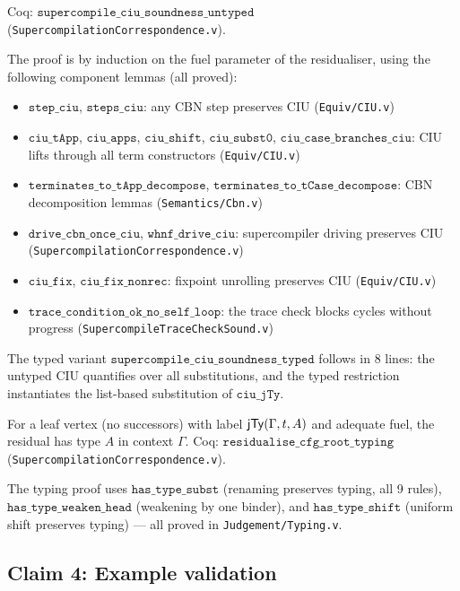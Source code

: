 \noindent Coq: $\texttt{supercompile\_ciu\_soundness\_untyped}$ (\texttt{SupercompilationCorrespondence.v}).

The proof is by induction on the fuel parameter of the residualiser, using the following component lemmas (all proved):
\begin{itemize}[leftmargin=*,nosep]
\item $\texttt{step\_ciu}$, $\texttt{steps\_ciu}$: any CBN step preserves CIU (\texttt{Equiv/CIU.v})
\item $\texttt{ciu\_tApp}$, $\texttt{ciu\_apps}$, $\texttt{ciu\_shift}$, $\texttt{ciu\_subst0}$, $\texttt{ciu\_case\_branches\_ciu}$: CIU lifts through all term constructors (\texttt{Equiv/CIU.v})
\item $\texttt{terminates\_to\_tApp\_decompose}$, $\texttt{terminates\_to\_tCase\_decompose}$: CBN decomposition lemmas (\texttt{Semantics/Cbn.v})
\item $\texttt{drive\_cbn\_once\_ciu}$, $\texttt{whnf\_drive\_ciu}$: supercompiler driving preserves CIU (\texttt{SupercompilationCorrespondence.v})
\item $\texttt{ciu\_fix}$, $\texttt{ciu\_fix\_nonrec}$: fixpoint unrolling preserves CIU (\texttt{Equiv/CIU.v})
\item $\texttt{trace\_condition\_ok\_no\_self\_loop}$: the trace check blocks cycles without progress (\texttt{SupercompileTraceCheckSound.v})
\end{itemize}

The typed variant $\texttt{supercompile\_ciu\_soundness\_typed}$ follows in 8 lines: the untyped CIU quantifies over all substitutions, and the typed restriction instantiates the list-based substitution of $\texttt{ciu\_jTy}$.

\begin{theorem}
\label{thm:mech-typing}
For a leaf vertex (no successors) with label $\mathsf{jTy}(\Gamma,t,A)$ and adequate fuel, the residual has type $A$ in context $\Gamma$.
\newline Coq: $\texttt{residualise\_cfg\_root\_typing}$ (\texttt{SupercompilationCorrespondence.v}).
\end{theorem}

The typing proof uses $\texttt{has\_type\_subst}$ (renaming preserves typing, all 9 rules), $\texttt{has\_type\_weaken\_head}$ (weakening by one binder), and $\texttt{has\_type\_shift}$ (uniform shift preserves typing) --- all proved in \texttt{Judgement/Typing.v}.

\subsection{Claim 4: Example validation}


